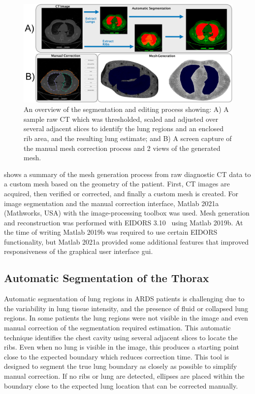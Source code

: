 \begin{figure}[H]
	\centering
	\includegraphics[width=\textwidth]{chapter5-CT_to_mesh/imgs/methods_figure.pdf}
	\caption[Mesh generation method overiew.]{\label{fig:segment_overview}%
	An overview of the segmentation and editing process showing: 
	A) A sample raw CT which was thresholded, scaled and adjusted over several 
	adjacent slices to identify
	the lung regions and an enclosed rib area, and the resulting lung estimate; and
	B) A screen  capture of the manual mesh correction process and 2 views of the generated
	mesh.
	}
\end{figure}

 shows a summary of the mesh generation process from raw diagnostic CT 
data to a custom mesh based on the geometry of the patient.
First, CT images are acquired, then verified or corrected, and finally a custom mesh is created.
For image segmentation and the manual correction interface,
Matlab 2021a (Mathworks, USA) with the 
image-processing toolbox was used.
Mesh generation and reconstruction was performed with 
EIDORS 3.10~\parencite{adler_eidors_2017} using Matlab 2019b.
At the time of writing Matlab 2019b was required to 
use certain EIDORS functionality, but Matlab 2021a provided some additional 
features that improved responsiveness of the 
graphical user interface \acrshort{gui}.

\subsection{Automatic Segmentation of the Thorax} \label{sec:auto-segment}
Automatic segmentation of lung regions in ARDS patients is challenging due to the variability
in lung tissue intensity, and the presence of fluid or collapsed lung regions. 
In some patients the lung regions were not visible in the image and even manual
correction of the segmentation required estimation. 
This automatic technique identifies the chest cavity using several adjacent slices to
locate the ribs.
Even when no lung is visible in the image, this produces a starting point
close to the expected boundary which reduces correction time. 
This tool is designed to segment the true lung boundary as closely as possible to 
simplify manual correction.
If no ribs or lung are detected, ellipses are placed within the boundary 
close to the expected lung location that 
can be corrected manually.

